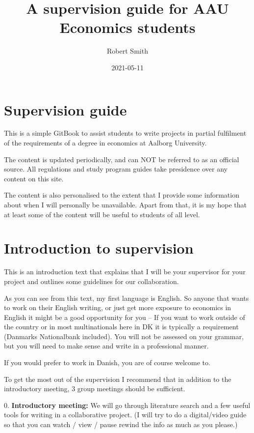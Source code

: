 \documentclass[
]{book}
\title{A supervision guide for AAU Economics students}
\author{Robert Smith}
\date{2021-05-11}
\begin{document}
\maketitle

{
\setcounter{tocdepth}{1}
\tableofcontents
}
\hypertarget{supervision-guide}{%
\chapter{Supervision guide}\label{supervision-guide}}

This is a simple GitBook to assist students to write projects in partial fulfilment of the requirements of a degree in economics at Aalborg University.

The content is updated periodically, and can NOT be referred to as an official source. All regulations and study program guides take presidence over any content on this site.

The content is also personalised to the extent that I provide some information about when I will personally be unavailable. Apart from that, it is my hope that at least some of the content will be useful to students of all level.

\hypertarget{introduction-to-supervision}{%
\chapter{Introduction to supervision}\label{introduction-to-supervision}}

This is an introduction text that explains that I will be your
supervisor for your project and outlines some guidelines for our
collaboration.

As you can see from this text, my first language is English. So anyone
that wants to work on their English writing, or just get more exposure
to economics in English it might be a good opportunity for you -- If you
want to work outside of the country or in most multinationals here in DK
it is typically a requirement (Danmarks Nationalbank included). You will
not be assessed on your grammar, but you will need to make sense and
write in a professional manner.

If you would prefer to work in Danish, you are of course welcome to.

To get the most out of the supervision I recommend that in addition to
the introductory meeting, 3 group meetings should be sufficient.

0. \textbf{Introductory meeting:} We will go through literature search and a
few useful tools for writing in a collaborative project. (I will try to
do a digital/video guide so that you can watch / view / pause rewind the
info as much as you please.)
\end{document}
